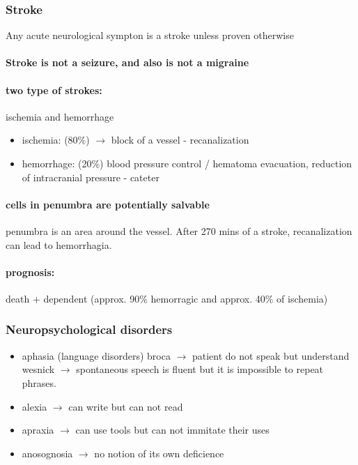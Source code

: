\documentclass[12pt,article,oneside,a4paper]{memoir}
\begin{document}
\subsubsection{Stroke} 
Any acute neurological sympton is a stroke unless proven otherwise
\paragraph{Stroke is not a seizure, and also is not a migraine}
\paragraph{two type of strokes:} ischemia and hemorrhage
\begin{itemize}
\item ischemia: (80\%) $\rightarrow$ block of a vessel - recanalization
\item hemorrhage: (20\%) blood pressure control / hematoma evacuation, reduction of intracranial pressure - cateter
\end{itemize}
\paragraph{cells in penumbra are potentially salvable} penumbra is an area around the vessel.
After 270 mins of a stroke, recanalization can lead to  hemorrhagia.
\paragraph{prognosis:} death + dependent (approx. 90\% hemorragic and approx. 40\% of ischemia)

\subsubsection{Neuropsychological disorders }
\begin{itemize}
\item aphasia (language disorders)
\subitem broca $\rightarrow$ patient do not speak but understand
\subitem wesnick $\rightarrow$ spontaneous speech is fluent but it is impossible to repeat phrases.
\item alexia $\rightarrow$ can write but can not read
\item apraxia $\rightarrow$ can use tools but can not immitate their uses
\item anosognosia $\rightarrow$ no notion of its own deficience
\end{itemize}

\end{document}
